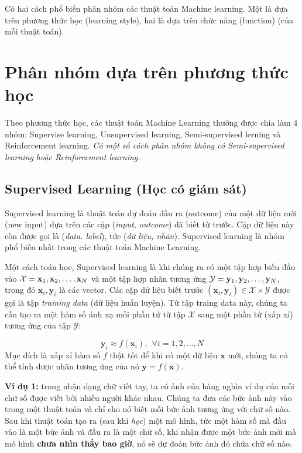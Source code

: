 
Có hai cách phổ biến phân nhóm các thuật toán Machine learning. Một là dựa trên phương thức học (learning style), hai là dựa trên chức năng (function) (của mỗi thuật toán). 
 
 
\section{Phân nhóm dựa trên phương thức học}
 
Theo phương thức học, các thuật toán Machine Learning thường được chia làm 4 nhóm: Supervise learning, Unsupervised learning, Semi-supervised lerning và Reinforcement learning. \textit{Có một số cách phân nhóm không có Semi-supervised learning hoặc Reinforcement learning.} 
 
 
\subsection{Supervised Learning (Học có giám sát) }
Supervised learning là thuật toán dự đoán đầu ra (outcome) của một dữ liệu mới (new input) dựa trên các cặp (\textit{input, outcome}) đã biết từ trước. Cặp dữ liệu này còn được gọi là (\textit{data. label}), tức (\textit{dữ liệu, nhãn}). Supervised learning là nhóm phổ biến nhất trong các thuật toán Machine Learning.  
 
Một cách toán học, Supervised learning là khi chúng ra có một tập hợp biến đầu vào $ \mathcal{X} = \\{\mathbf{x}_1, \mathbf{x}_2, \dots, \mathbf{x}_N\\} $ và một tập hợp nhãn tương ứng $ \mathcal{Y} = \\{\mathbf{y}_1, \mathbf{y}_2, \dots, \mathbf{y}_N\\} $, trong đó $ \mathbf{x}_i, \mathbf{y}_i $ là các vector.  
Các cặp dữ liệu biết trước $ (\mathbf{x}_i, \mathbf{y}_i) \in \mathcal{X} \times \mathcal{Y} $  
được gọi là tập \textit{training data} (dữ liệu huấn luyện). Từ tập traing data này, chúng ta cần tạo ra một hàm số ánh xạ mỗi phần tử từ tập $\mathcal{X}$ sang một phần tử (xấp xỉ) tương ứng của tập $\mathcal{Y}$: 
 
$$ \mathbf{y}_i \approx f(\mathbf{x}_i), ~~ \forall i = 1, 2, \dots, N$$  
Mục đích là xấp xỉ hàm số $f$ thật tốt để khi có một dữ liệu $\mathbf{x}$ mới, chúng ta có thể tính được nhãn tương ứng của nó $ \mathbf{y} = f(\mathbf{x}) $. 
     
\textbf{Ví dụ 1:} trong nhận dạng chữ viết tay, ta có ảnh của hàng nghìn ví dụ của mỗi chữ số được viết bởi nhiều người khác nhau. Chúng ta đưa các bức ảnh này vào trong một thuật toán và chỉ cho nó biết mỗi bức ảnh tương ứng với chữ số nào. Sau khi thuật toán tạo ra (sau khi \textit{học}) một mô hình, tức một hàm số mà đầu vào là một bức ảnh và đầu ra là một chữ số, khi nhận được một bức ảnh mới mà mô hình \textbf{chưa nhìn thấy bao giờ}, nó sẽ dự đoán bức ảnh đó chứa chữ số nào. 
 
